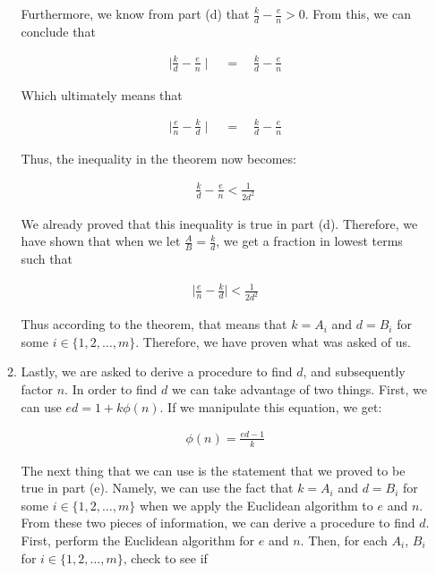 \documentclass[11pt]{article}
\theoremstyle{definition}
\begin{document}
\begin{enumerate}
\begin{enumerate}
Furthermore, we know from part (d) that $\frac{k}{d} - \frac{e}{n} > 0$. From this, we can conclude that 

\begin{align*}
    \mid \frac{k}{d} - \frac{e}{n} \mid \quad = \quad \frac{k}{d} - \frac{e}{n}
\end{align*}

Which ultimately means that

\begin{align*}
   \mid \frac{e}{n} - \frac{k}{d} \mid \quad = \quad \frac{k}{d} - \frac{e}{n}
\end{align*}

Thus, the inequality in the theorem now becomes:

\begin{align*}
    \frac{k}{d} - \frac{e}{n} < \frac{1}{2d^2}
\end{align*}

We already proved that this inequality is true in part (d). Therefore, we have shown that when we let $\frac{A}{B} = \frac{k}{d}$, we get a fraction in lowest terms such that 

\begin{align*}
    \mid \frac{e}{n} - \frac{k}{d} \mid < \frac{1}{2d^2}
\end{align*}

Thus according to the theorem, that means that $k = A_i$ and $d = B_i$ for some $i \in \{1, 2, \ldots, m\}$. Therefore, we have proven what was asked of us.
\\

\item %
Lastly, we are asked to derive a procedure to find $d$, and subsequently factor $n$. In order to find $d$ we can take advantage of two things. First, we can use $ed = 1 + k\phi(n)$. If we manipulate this equation, we get:

\begin{align*}
    \phi(n) = \frac{ed - 1}{k}
\end{align*}

The next thing that we can use is the statement that we proved to be true in part (e). Namely, we can use the fact that $k = A_i$ and $d = B_i$ for some $i \in \{1, 2, \ldots, m\}$ when we apply the Euclidean algorithm to $e$ and $n$. From these two pieces of information, we can derive a procedure to find $d$. \\

First, perform the Euclidean algorithm for $e$ and $n$. Then, for each $A_i$, $B_i$ for $i \in \{1, 2, \ldots, m\}$, check to see if 


\end{enumerate}
\end{enumerate}
\end{document}
